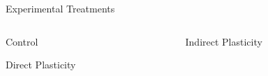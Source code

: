 \vspace{1ex}
\begin{block}{Experimental Treatments}
\vspace{-1ex}
\begin{columns}
\begin{column}{0.5\textwidth}
\begin{alertblock}{Control}
% 
\end{alertblock}
\begin{alertblock}{Direct Plasticity}
% 
\end{alertblock}
\end{column}
\begin{column}{0.5\textwidth}
\begin{alertblock}{Indirect Plasticity}
% 
\end{alertblock}
\end{column}
\end{columns}
\end{block}
